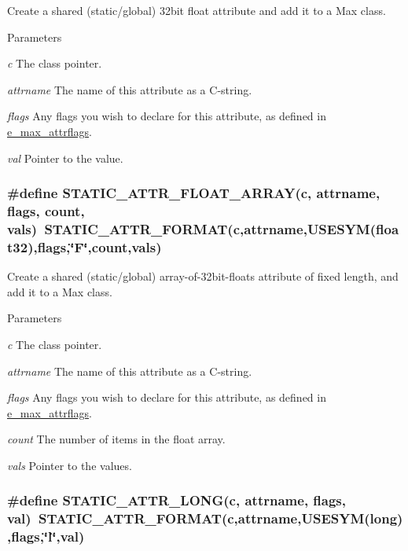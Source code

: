 Create a shared (static/global) 32bit float attribute and add it to a Max class. 
\begin{DoxyParams}{Parameters}
\item[{\em c}]The class pointer. \item[{\em attrname}]The name of this attribute as a C-\/string. \item[{\em flags}]Any flags you wish to declare for this attribute, as defined in \hyperlink{group__attr_gaf296cfc6741bb19207f6ed8062809115}{e\_\-max\_\-attrflags}. \item[{\em val}]Pointer to the value. \end{DoxyParams}
\hypertarget{group__attr_ga1afb57bc57076c4ec1ee127bbe100740}{
\subsubsection[{STATIC\_\-ATTR\_\-FLOAT\_\-ARRAY}]{\setlength{\rightskip}{0pt plus 5cm}\#define STATIC\_\-ATTR\_\-FLOAT\_\-ARRAY(c, \/  attrname, \/  flags, \/  count, \/  vals)~STATIC\_\-ATTR\_\-FORMAT(c,attrname,USESYM(float32),flags,\char`\"{}F\char`\"{},count,vals)}}
\label{group__attr_ga1afb57bc57076c4ec1ee127bbe100740}


Create a shared (static/global) array-\/of-\/32bit-\/floats attribute of fixed length, and add it to a Max class. 
\begin{DoxyParams}{Parameters}
\item[{\em c}]The class pointer. \item[{\em attrname}]The name of this attribute as a C-\/string. \item[{\em flags}]Any flags you wish to declare for this attribute, as defined in \hyperlink{group__attr_gaf296cfc6741bb19207f6ed8062809115}{e\_\-max\_\-attrflags}. \item[{\em count}]The number of items in the float array. \item[{\em vals}]Pointer to the values. \end{DoxyParams}
\hypertarget{group__attr_gaddc7ea0e35bc72027f13798912c80286}{
\subsubsection[{STATIC\_\-ATTR\_\-LONG}]{\setlength{\rightskip}{0pt plus 5cm}\#define STATIC\_\-ATTR\_\-LONG(c, \/  attrname, \/  flags, \/  val)~STATIC\_\-ATTR\_\-FORMAT(c,attrname,USESYM(long),flags,\char`\"{}l\char`\"{},val)}}
\label{group__attr_gaddc7ea0e35bc72027f13798912c80286}


